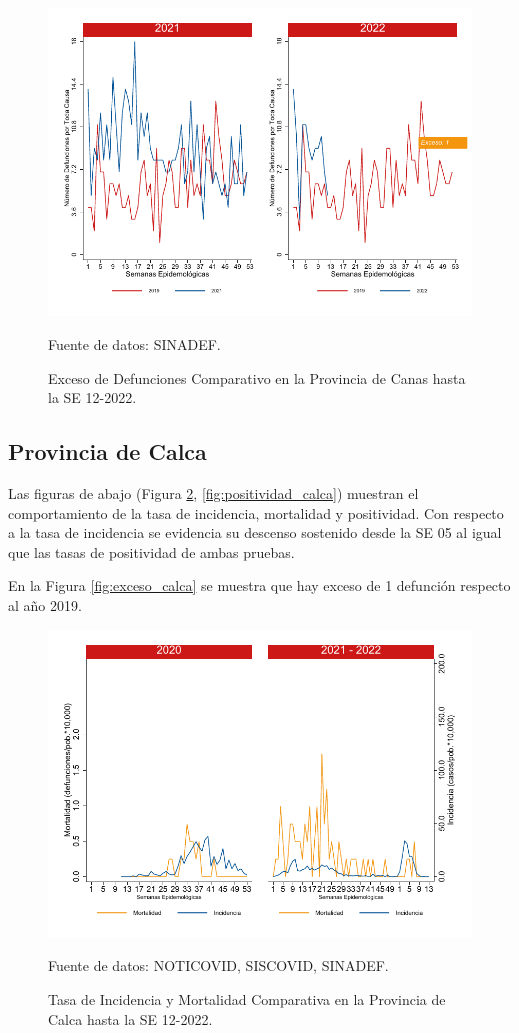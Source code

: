 \documentclass[12pt,a4paper,openany]{book}
\begin{document}
		\begin{figure}[h]
			\caption{Exceso de Defunciones Comparativo en la Provincia de Canas hasta la SE 12-2022.}\label{fig:exceso_canas}
			\begin{center}
				\includegraphics[width=0.7\linewidth]{../figuras/exceso_3.pdf}
			\end{center}
			{\footnotesize {Fuente de datos: SINADEF.}}
		\end{figure}
		
		\clearpage
		
		\subsection*{Provincia de Calca}
		\noindent Las figuras de abajo (Figura \ref{fig:inc_mort_calca}, \ref{fig:positividad_calca}) muestran el comportamiento de la tasa de incidencia, mortalidad y  positividad. Con respecto a la tasa de incidencia se evidencia su descenso sostenido desde la SE 05 al igual que las tasas de positividad de ambas pruebas.
		
		En la Figura \ref{fig:exceso_calca} se muestra que hay exceso de 1 defunción respecto al año 2019.
		
		\begin{figure}[h]
			\caption{Tasa de Incidencia y Mortalidad Comparativa en la Provincia de Calca hasta la SE 12-2022.}\label{fig:inc_mort_calca}
			\begin{center}
				\includegraphics[width=0.85\linewidth]{../figuras/incidencia_mortalidad_20_21_4.pdf}
			\end{center}
			{\footnotesize {Fuente de datos: NOTICOVID, SISCOVID, SINADEF.}}
		\end{figure}
		
\end{document}
